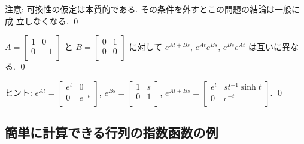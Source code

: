 \documentclass[12pt,twoside]{jarticle}
\begin{document}
\medskip
\noindent 
注意: 可換性の仮定は本質的である.  その条件を外すとこの問題の結論は一般に成
立しなくなる.
\qed


\begin{question}[15点]
  \(
    A =
    \begin{bmatrix}
      1 & 0 \\
      0 & -1 \\
    \end{bmatrix}
  \) と %
  \(
    B =
    \begin{bmatrix}
      0 & 1 \\
      0 & 0 \\
    \end{bmatrix}
  \) に対して $e^{At+Bs}$, $e^{At} e^{Bs}$, $e^{Bs} e^{At}$ は互いに異なる.
  \qed
\end{question}

\noindent
ヒント:   \(
  e^{At} =
  \begin{bmatrix}
    e^t & 0 \\
    0 & e^{-t} \\
  \end{bmatrix}
\), \(
  e^{Bs} =
  \begin{bmatrix}
    1 & s \\
    0 & 1 \\
  \end{bmatrix}
\), \(
  e^{At+Bs} =
  \begin{bmatrix}
    e^t & s t^{-1} \sinh t \\
    0 & e^{-t} \\
  \end{bmatrix}
\).
\qed


\subsection{簡単に計算できる行列の指数函数の例}
\label{sec:sec-exp-easy}

\end{document}
